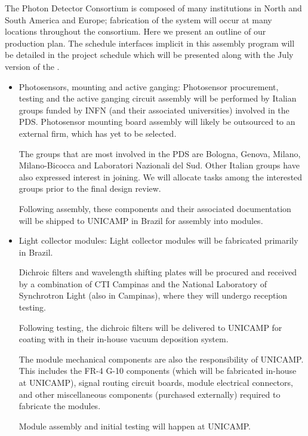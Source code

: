 The Photon Detector Consortium is composed of many institutions in North and South America and Europe; fabrication of the system will occur at many locations throughout the consortium.  Here we present an outline of our production plan.  The schedule interfaces implicit in this assembly program will be detailed in the project schedule which will be presented along with the July version of the .

\begin{itemize}

\item Photosensors, mounting and active ganging:  Photosensor procurement, testing and the active ganging circuit assembly will be performed by Italian groups funded by INFN (and their associated universities) involved in the PDS. Photosensor mounting board assembly will likely be outsourced to an external firm, which has yet to be selected.

The groups that are most involved in the PDS are Bologna, Genova, Milano, Milano-Bicocca and Laboratori Nazionali del Sud.  Other Italian groups have also expressed interest in joining.  We will allocate tasks among the interested groups prior to the final design review.

Following assembly, these components and their associated  documentation will be shipped to UNICAMP in Brazil for assembly into  modules.

\item Light collector modules:  Light collector modules will be fabricated primarily in Brazil.  

Dichroic filters and wavelength shifting plates will be procured and received by a combination of CTI Campinas and the National Laboratory of Synchrotron Light (also in Campinas), where they will undergo reception  testing.

Following testing, the dichroic filters will be delivered to UNICAMP for coating with  in their in-house vacuum deposition system.

The module mechanical components are also the responsibility of UNICAMP.  This includes the FR-4 G-10 components (which will be fabricated in-house at UNICAMP), signal routing circuit boards, module electrical connectors, and other miscellaneous components (purchased externally) required to fabricate the modules.

Module assembly and initial  testing will happen at UNICAMP.


\end{itemize}
